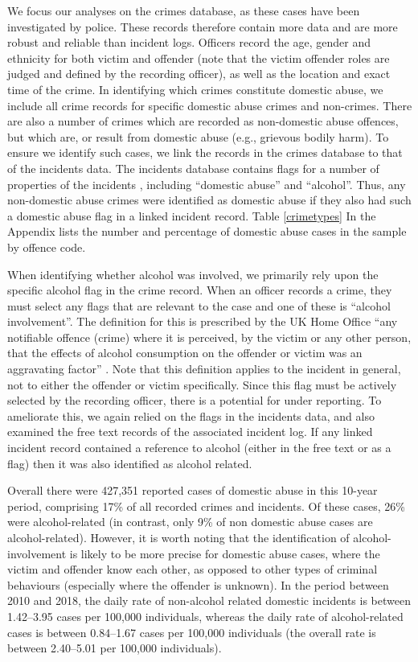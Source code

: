 \documentclass[12pt, a4paper]{article}
\begin{document}
We focus our analyses on the crimes database, as these cases have been investigated by police. These records therefore contain more data and are more robust and reliable than incident logs. Officers record the age, gender and ethnicity for both victim and offender (note that the victim offender roles are judged and defined by the recording officer), as well as the location and exact time of the crime.
In identifying which crimes constitute domestic abuse, we include all crime records for specific domestic abuse crimes and non-crimes. There are also a number of crimes which are recorded as non-domestic abuse offences, but which are, or result from domestic abuse (e.g., grievous bodily harm). To ensure we identify such cases, we link the records in the crimes database to that of the incidents data. The incidents database contains flags for a number of properties of the incidents , including ``domestic abuse'' and ``alcohol''. Thus, any non-domestic abuse crimes were identified as domestic abuse if they also had such a domestic abuse flag in a linked incident record. Table \ref{crimetypes} In the Appendix lists the number and percentage of domestic abuse cases in the sample by offence code.

When identifying whether alcohol was involved, we primarily rely upon the specific alcohol flag in the crime record. When an officer records a crime, they must select any flags that are relevant to the case and one of these is ``alcohol involvement''. The definition for this is prescribed by the UK Home Office ``any notifiable offence (crime) where it is perceived, by the victim or any other person, that the effects of alcohol consumption on the offender or victim was an aggravating factor'' \cite{Office2019}. Note that this definition applies to the incident in general, not to either the offender or victim specifically. Since this flag must be actively selected by the recording officer, there is a potential for under reporting. To ameliorate this, we again relied on the flags in the incidents data, and also examined the free text records of the associated incident log. If any linked incident record contained a reference to alcohol (either in the free text or as a flag) then it was also identified as alcohol related.


 Overall there were 427,351 reported cases of domestic abuse in this 10-year period, comprising 17\% of all recorded crimes and incidents. Of these cases, 26\% were alcohol-related (in contrast, only 9\% of non domestic abuse cases are alcohol-related). However, it is worth noting that the identification of alcohol-involvement is likely to be more precise for domestic abuse cases, where the victim and offender know each other, as opposed to other types of criminal behaviours (especially where the offender is unknown). In the period between 2010 and 2018, the daily rate of non-alcohol related domestic incidents is between 1.42--3.95 cases per 100,000 individuals, whereas the daily rate of alcohol-related cases is between 0.84--1.67 cases per 100,000 individuals (the overall rate is between 2.40--5.01 per 100,000 individuals).
\end{document}
